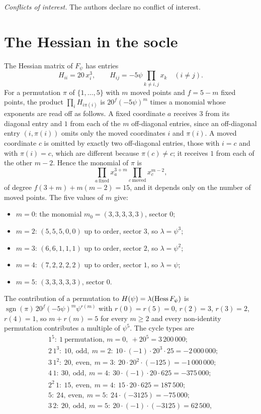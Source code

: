 \smallskip\noindent\textit{Conflicts of interest.} The authors declare no
conflict of interest.

\appendix


\section{The Hessian in the socle}\label{app:hessian}

The Hessian matrix of $F_\psi$ has entries
\[
H_{ii}=20\,x_i^3,\qquad H_{ij}=-5\psi\prod_{k\ne i,j}x_k\quad(i\ne j).
\]
For a permutation $\pi$ of $\{1,\dots,5\}$ with $m$ moved points and
$f=5-m$ fixed points, the product $\prod_iH_{i\pi(i)}$ is
$20^f(-5\psi)^m$ times a monomial whose exponents are read off as follows.
A fixed coordinate $a$ receives $3$ from its diagonal entry and $1$ from each
of the $m$ off-diagonal entries, since an off-diagonal entry $(i,\pi(i))$
omits only the moved coordinates $i$ and $\pi(i)$. A moved coordinate $c$
is omitted by exactly two off-diagonal entries, those with $i=c$ and with
$\pi(i)=c$, which are different because $\pi(c)\ne c$; it receives $1$ from
each of the other $m-2$. Hence the monomial of $\pi$ is
\[
\prod_{a\ \mathrm{fixed}}x_a^{3+m}\prod_{c\ \mathrm{moved}}x_c^{m-2},
\]
of degree $f(3+m)+m(m-2)=15$, and it depends only on the number of moved
points. The five values of $m$ give:
\begin{itemize}[leftmargin=*,itemsep=1pt]
\item $m=0$: the monomial $m_0=(3,3,3,3,3)$, sector $0$;
\item $m=2$: $(5,5,5,0,0)$ up to order, sector $3$, so $\lambda=\psi^3$;
\item $m=3$: $(6,6,1,1,1)$ up to order, sector $2$, so $\lambda=\psi^2$;
\item $m=4$: $(7,2,2,2,2)$ up to order, sector $1$, so $\lambda=\psi$;
\item $m=5$: $(3,3,3,3,3)$, sector $0$.
\end{itemize}
The contribution of a permutation to $H(\psi)=\lambda(\operatorname{Hess} F_\psi)$ is
$\operatorname{sgn}(\pi)\,20^f(-5\psi)^m\psi^{r(m)}$ with $r(0)=r(5)=0$,
$r(2)=3$, $r(3)=2$, $r(4)=1$, so $m+r(m)=5$ for every $m\ge2$ and every
non-identity permutation contributes a multiple of $\psi^5$. The cycle
types are
\[
\begin{aligned}
&1^5:\ 1\ \text{permutation, }m=0,\ +20^5=3\,200\,000;\\
&2\,1^3:\ 10,\ \text{odd},\ m=2:\ 10\cdot(-1)\cdot20^3\cdot25=-2\,000\,000;\\
&3\,1^2:\ 20,\ \text{even},\ m=3:\ 20\cdot20^2\cdot(-125)=-1\,000\,000;\\
&4\,1:\ 30,\ \text{odd},\ m=4:\ 30\cdot(-1)\cdot20\cdot625=-375\,000;\\
&2^2\,1:\ 15,\ \text{even},\ m=4:\ 15\cdot20\cdot625=187\,500;\\
&5:\ 24,\ \text{even},\ m=5:\ 24\cdot(-3125)=-75\,000;\\
&3\,2:\ 20,\ \text{odd},\ m=5:\ 20\cdot(-1)\cdot(-3125)=62\,500,
\end{aligned}
\]
